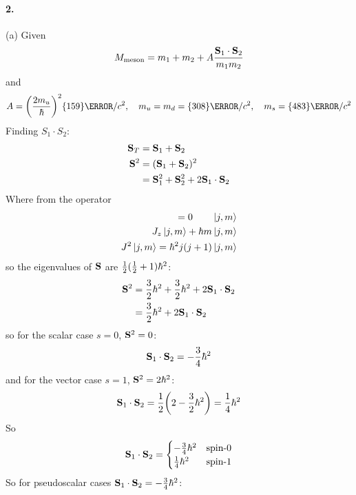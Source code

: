 \documentclass[../main.tex]{subfiles}
\begin{document}
\newpage
\paragraph*{2.} (a) Given 
\begin{align*}
    M_{\text{meson}} = m_1 + m_2 + A\frac{\vb S_1 \cdot \vb S_2}{m_1m_2}
\end{align*}
and 
\begin{align*}
    A = \qt(\frac{2m_u}{\hbar})^2 \qty{159}{\MeV/c^2}, \quad m_u = m_d = \qty{308}{\MeV/c^2}, \quad m_s = \qty{483}{\MeV/c^2}
\end{align*}
Finding $S_1 \cdot S_2$:
\begin{align*}
    \vb S_T &= \vb S_1 + \vb S_2 \\
    \vb S^2 &= (\vb S_1 + \vb S_2)^2 \\
    &= \vb S_1^2 + \vb S_2^2 + 2\vb S_1 \cdot \vb S_2
\end{align*}
Where from the operator
\begin{align*}
    [J^2, J_z] = 0 \qquad \ket{j, m} \\
    J_z \ket{j,m} + \hbar m \ket{j,m} \\
    J^2 \ket{j,m} = \hbar^2 j(j+1) \ket{j,m}
\end{align*}
so the eigenvalues of $\vb S$ are $\frac{1}{2}(\frac{1}{2} + 1)\hbar^2$:
\begin{align*}
    \vb S^2 &= \frac{3}{2} \hbar^2 + \frac{3}{2} \hbar^2 + 2\vb S_1 \cdot \vb S_2 \\
    &= \frac{3}{2}\hbar^2 + 2\vb S_1 \cdot \vb S_2
\end{align*}
so for the scalar case $s =0$, $\vb S^2 = 0$:
\begin{align*}
    \vb S_1 \cdot \vb S_2 = -\frac{3}{4}\hbar^2
\end{align*}
and for the vector case $s = 1$, $\vb S^2 = 2\hbar^2$:
\begin{align*}
    \vb S_1 \cdot \vb S_2 = \ohf \qt(2 - \thf \hbar^2) = \frac{1}{4}\hbar^2
\end{align*}
So
\begin{align*}
    \vb S_1 \cdot \vb S_2 = \begin{cases}
        -\frac{3}{4}\hbar^2 & \text{spin-0} \\
        \frac{1}{4} \hbar^2 & \text{spin-1}
    \end{cases}
\end{align*}
So for pseudoscalar cases $\vb S_1 \cdot \vb S_2 = -\frac{3}{4}\hbar^2$:
\end{document}
